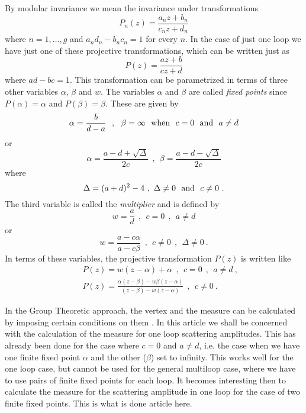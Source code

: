 \documentclass[a4paper,12pt]{article}
\begin{document}
By modular invariance we mean the invariance under transformations
\begin{equation}
P_n(z)=\frac{a_nz+b_n}{c_nz+d_n}
\end{equation}
where $n=1,\dots ,g$ and $a_nd_n-b_nc_n=1$ for every $n$. In the case of just one loop we have just one of these projective transformations, which can be written just as
\begin{equation}
P(z)=\frac{az+b}{cz+d}
\end{equation}
where $ad-bc=1$. This transformation can be parametrized in terms of three other variables
$\alpha $, $\beta $ and $w$. The variables $\alpha $ and $\beta $ are called {\sl fixed
points} since $P(\alpha )=\alpha $ and $P(\beta )=\beta $. These are given by
\begin{equation}
\alpha =\frac{b}{d-a}\ \ ,\ \ \beta =\infty \ \ {\rm when}\ \  c=0 \ \ {\rm and}\ \  a\neq d
\end{equation}
or
\begin{equation}
\alpha =\frac{a-d+\sqrt{\Delta }}{2c}\ \ ,\ \ \beta =\frac{a-d-\sqrt{\Delta }}{2c}
\end{equation}
where
\begin{equation}
\Delta =(a+d)^2-4\ ,\ \Delta \neq 0 \ \ {\rm and}\ \  c\neq 0\ .
\end{equation}
The third variable is called the {\sl multiplier} and is defined by
\begin{equation}
w=\frac{a}{d}\ \ ,\ \ c=0\ \ ,\ \ a\neq d
\end{equation}
or
\begin{equation}
w=\frac{a-c\alpha }{a-c\beta }\ \ ,\ \ c\neq 0\ \ ,\ \ \Delta \neq 0\ .
\end{equation}
In terms of these variables, the projective transformation $P(z)$ is written like
\begin{eqnarray}
 & & P(z)=w(z-\alpha )+\alpha \ \ ,\ \ c=0\ \ ,\ \ a\neq d\ ,\\
 & & P(z)=\frac{\alpha (z-\beta )-w\beta (z-\alpha )}{(z-\beta )-w(z-\alpha )}\ \ ,\ \ c\neq
0\ .
\end{eqnarray}

In the Group Theoretic approach, the vertex and the measure can be calculated by imposing
certain conditions on them \cite{5}. In this article we shall be concerned with the
calculation of the measure for one loop scattering amplitudes. This has already been done for the case where $c=0$ and $a\neq d$, i.e. the case when we have one finite fixed point $\alpha $ and the other ($\beta $) set to infinity. This works well for the one loop case, but cannot be used for the general multiloop case, where we have to use pairs of finite fixed points for each loop. It becomes interesting then to calculate the measure for the scattering amplitude in one loop for the case of two finite fixed points. This is what is done article here.
\end{document}
